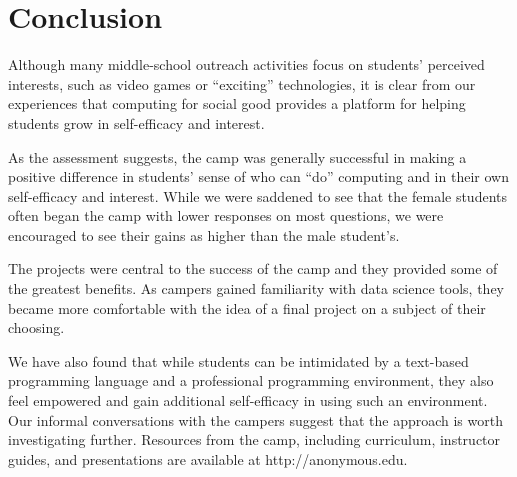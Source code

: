 \section{Conclusion}

Although many middle-school outreach activities focus on students'
perceived interests, such as video games or ``exciting'' technologies,
it is clear from our experiences that computing for social good
provides a platform for helping students grow in self-efficacy and
interest.

As the assessment suggests, the camp was generally successful in
making a positive difference in students' sense of who can ``do''
computing and in their own self-efficacy and interest.  While we
were saddened to see that the female students often began the camp with
lower responses on most questions, we were encouraged to see their
gains as higher than the male student's.

The projects were central to the success of the camp and they
provided some of the greatest benefits.  As campers gained
familiarity with data science tools, they became more comfortable
with the idea of a final project on a subject of their choosing.

We have also found that while students can be intimidated by a
text-based programming language and a professional programming
environment, they also feel empowered and gain additional self-efficacy
in using such an environment.  Our informal conversations with the
campers suggest that the approach is worth investigating further.
Resources from the camp, including curriculum, instructor guides,
and presentations are available at http://anonymous.edu.

